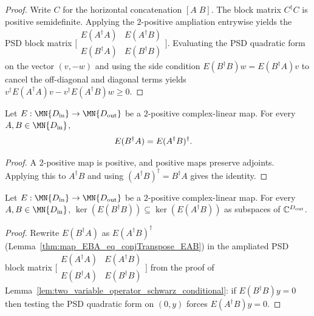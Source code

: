 \begin{proof}
    \leanok

    Write $C$ for the horizontal concatenation $[A\;B]$.
    The block matrix $C^\dagger C$ is positive semidefinite.
    Applying the $2$-positive ampliation entrywise yields the PSD block matrix
    $\bigl[\begin{smallmatrix}
        E(A^\dagger A) & E(A^\dagger B)\\
        E(B^\dagger A) & E(B^\dagger B)
    \end{smallmatrix}\bigr]$.
    Evaluating the PSD quadratic form on the vector $(v,-w)$ and using
    the side condition $E(B^\dagger B)w = E(B^\dagger A)v$ to cancel the
    off-diagonal and diagonal terms yields
    $v^\dagger E(A^\dagger A)v - v^\dagger E(A^\dagger B)w \ge 0$.
\end{proof}

\begin{theorem}
    \label{thm:map_EBA_eq_conjTranspose_EAB}
    \leanok
    Let $E:\MN{D_{\rm in}}\to\MN{D_{\rm out}}$ be a $2$-positive
    complex-linear map. For every $A,B\in\MN{D_{\rm in}}$,
    \begin{align}
        E(B^\dagger A) & = E(A^\dagger B)^\dagger.
        \notag
    \end{align}
\end{theorem}

\begin{proof}\leanok
    A $2$-positive map is positive, and positive maps preserve adjoints.
    Applying this to $A^\dagger B$ and using
    $(A^\dagger B)^\dagger = B^\dagger A$ gives the identity.
\end{proof}

\begin{theorem}
    \label{thm:ker_EBB_le_ker_EAB}
    \leanok
    Let $E:\MN{D_{\rm in}}\to\MN{D_{\rm out}}$ be a $2$-positive
    complex-linear map. For every $A,B\in\MN{D_{\rm in}}$,
    $\ker(E(B^\dagger B))\subseteq\ker(E(A^\dagger B))$ as subspaces of
    $\mathbb C^{D_{\rm out}}$.
\end{theorem}

\begin{proof}\leanok
    Rewrite $E(B^\dagger A)$ as $E(A^\dagger B)^\dagger$
    (Lemma~\ref{thm:map_EBA_eq_conjTranspose_EAB}) in the ampliated PSD
    block matrix $\bigl[\begin{smallmatrix}
        E(A^\dagger A) & E(A^\dagger B)\\
        E(B^\dagger A) & E(B^\dagger B)
    \end{smallmatrix}\bigr]$ from the proof of
    Lemma~\ref{lem:two_variable_operator_schwarz_conditional}: if
    $E(B^\dagger B)y=0$ then testing the PSD quadratic form on $(0,y)$
    forces $E(A^\dagger B)y=0$.
\end{proof}

